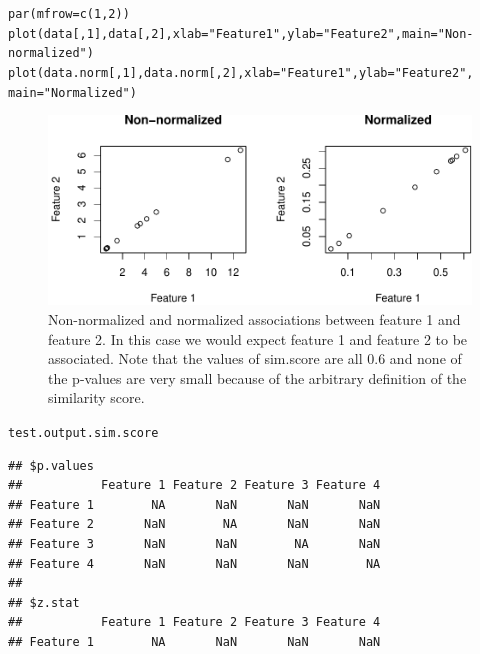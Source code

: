 \documentclass{article}\usepackage[]{graphicx}\usepackage[usenames,dvipsnames]{color}
\makeatletter
\def\maxwidth{ %
  \ifdim\Gin@nat@width>\linewidth
    \linewidth
  \else
    \Gin@nat@width
  \fi
}
\newcommand{\hlnum}[1]{\textcolor[rgb]{0.816,0.125,0.439}{#1}}%
\newcommand{\hlstr}[1]{\textcolor[rgb]{0.251,0.627,0.251}{#1}}%
\newcommand{\hlstd}[1]{\textcolor[rgb]{0.251,0.251,0.251}{#1}}%
\newcommand{\hlkwc}[1]{\textcolor[rgb]{0.251,0.251,0.251}{#1}}%
\newcommand{\hlkwd}[1]{\textcolor[rgb]{0.878,0.439,0.125}{#1}}%
\newenvironment{knitrout}{}{} %
\makeatother
\begin{document}
\begin{knitrout}
\color{fgcolor}\begin{kframe}
\begin{alltt}
\hlkwd{par}\hlstd{(}\hlkwc{mfrow}\hlstd{=}\hlkwd{c}\hlstd{(}\hlnum{1}\hlstd{,}\hlnum{2}\hlstd{))}
\hlkwd{plot}\hlstd{(data[,}\hlnum{1}\hlstd{],data[,}\hlnum{2}\hlstd{],}\hlkwc{xlab}\hlstd{=}\hlstr{"Feature 1"}\hlstd{,}\hlkwc{ylab}\hlstd{=}\hlstr{"Feature 2"}\hlstd{,}\hlkwc{main}\hlstd{=}\hlstr{"Non-normalized"}\hlstd{)}
\hlkwd{plot}\hlstd{(data.norm[,}\hlnum{1}\hlstd{],data.norm[,}\hlnum{2}\hlstd{],}\hlkwc{xlab}\hlstd{=}\hlstr{"Feature 1"}\hlstd{,}\hlkwc{ylab}\hlstd{=}\hlstr{"Feature 2"}\hlstd{,}
     \hlkwc{main}\hlstd{=}\hlstr{"Normalized"}\hlstd{)}
\end{alltt}
\end{kframe}\begin{figure}[H]
\includegraphics[width=\maxwidth]{figure/unnamed-chunk-11-1} \caption{Non-normalized and normalized associations between feature 1 and feature 2.  In this case we would expect feature 1 and feature 2 to be associated. Note that the values of sim.score are all 0.6 and none of the p-values are very small because of the arbitrary definition of the similarity score.}\label{fig:unnamed-chunk-11}
\end{figure}
\begin{kframe}\begin{alltt}
\hlstd{test.output.sim.score}
\end{alltt}
\begin{verbatim}
## $p.values
##           Feature 1 Feature 2 Feature 3 Feature 4
## Feature 1        NA       NaN       NaN       NaN
## Feature 2       NaN        NA       NaN       NaN
## Feature 3       NaN       NaN        NA       NaN
## Feature 4       NaN       NaN       NaN        NA
## 
## $z.stat
##           Feature 1 Feature 2 Feature 3 Feature 4
## Feature 1        NA       NaN       NaN       NaN

\end{verbatim}
\end{kframe}
\end{knitrout}
\end{document}
